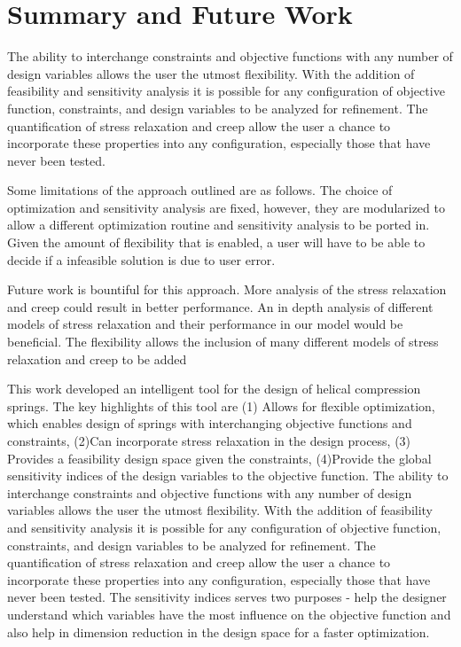\documentclass[10pt]{article}
\begin{document}
\newpage

\section{Summary and Future Work}
\label{sec:Summary}
The ability to interchange constraints and objective functions with any number of design variables allows the user the utmost flexibility. With the addition of feasibility and sensitivity analysis it is possible for any configuration of objective function, constraints, and design variables to be analyzed for refinement. The quantification of stress relaxation and creep allow the user a chance to incorporate these properties into any configuration, especially those that have never been tested. 

Some limitations of the approach outlined are as follows. The choice of optimization and sensitivity analysis are fixed, however, they are modularized to allow a different optimization routine and sensitivity analysis to be ported in. Given the amount of flexibility that is enabled, a user will have to be able to decide if a infeasible solution is due to user error. 

Future work is bountiful for this approach. More analysis of the stress relaxation and creep could result in better performance. An in depth analysis of different models of stress relaxation and their performance in our model would be beneficial. The flexibility allows the inclusion of many different models of stress relaxation and creep to be added

This work developed an intelligent tool for the design of helical compression springs. The key highlights of this tool are (1) Allows for flexible optimization, which enables design of springs with interchanging objective functions and constraints, (2)Can incorporate stress relaxation in the design process, (3) Provides a feasibility design space given the constraints, (4)Provide the global sensitivity indices of the design variables to the objective function. The ability to interchange constraints and objective functions with any number of design variables allows the user the utmost flexibility. With the addition of feasibility and sensitivity analysis it is possible for any configuration of objective function, constraints, and design variables to be analyzed for refinement. The quantification of stress relaxation and creep allow the user a chance to incorporate these properties into any configuration, especially those that have never been tested. The sensitivity indices serves two purposes - help the designer understand which variables have the most influence on the objective function and also help in dimension reduction in the design space for a faster optimization.
\end{document}
